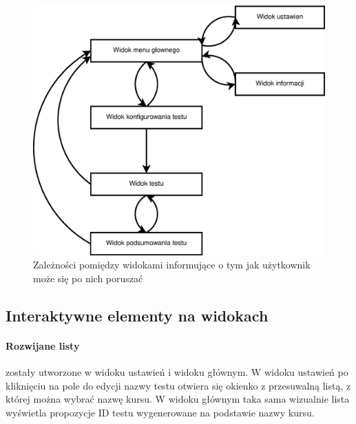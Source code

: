 \documentclass[archivemod, eng]{mgr}
\begin{document}
			\begin{center}
				\begin{figure}[ht]
					\centering
					\includegraphics[scale=0.5]{diagram_zaleznosci_miedzy_widokami.eps}
					\caption{Zależności pomiędzy widokami informujące o tym jak użytkownik może się po nich poruszać}
				\end{figure}
			\end{center}
		
			\subsection{Interaktywne elementy na widokach}
		
				\paragraph{Rozwijane listy}
				zostały utworzone w widoku ustawień i widoku głównym. W widoku ustawień po kliknięciu na pole do edycji nazwy testu otwiera się okienko z przesuwalną listą, z której można wybrać nazwę kursu. W widoku głównym taka sama wizualnie lista wyświetla propozycje ID testu wygenerowane na podstawie nazwy kursu.
		
\end{document}
